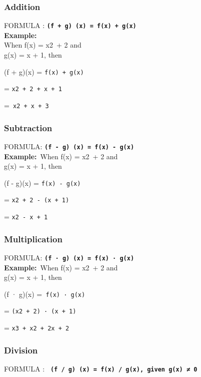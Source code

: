 \documentclass[
]{article}
\begin{document}
\hypertarget{addition}{%
\subsubsection{Addition}\label{addition}}

FORMULA : \textbf{\texttt{(f\ +\ g)\ (x)\ =\ f(x)\ +\ g(x)}}\\
\textbf{Example:}~\\
When f(x) = x2~+ 2 and\\
g(x) = x + 1, then

(f + g)(x) = \texttt{f(x)\ +\ g(x)}

= \texttt{x2~+\ 2\ +\ x\ +\ 1}

=\texttt{\ x2~+\ x\ +\ 3}

\hypertarget{subtraction}{%
\subsubsection{Subtraction}\label{subtraction}}

FORMULA: \textbf{\texttt{(f\ -\ g)\ (x)\ =\ f(x)\ -\ g(x)}}\\
\textbf{Example:}~When f(x) = x2~+ 2 and\\
g(x) = x + 1, then

(f - g)(x) = \texttt{f(x)\ -\ g(x)}

= \texttt{x2~+\ 2\ -\ (x\ +\ 1)}

= \texttt{x2~-\ x\ +\ 1}

\hypertarget{multiplication}{%
\subsubsection{Multiplication}\label{multiplication}}

FORMULA: \textbf{\texttt{(f\ ·\ g)\ (x)\ =\ f(x)\ ·\ g(x)}}\\
\textbf{Example:}~When f(x) = x2~+ 2 and\\
g(x) = x + 1, then

(f · g)(x) =\texttt{\ f(x)\ ·\ g(x)}

= \texttt{(x2~+\ 2)\ ·\ (x\ +\ 1)}

= \texttt{x3~+\ x2~+\ 2x\ +\ 2}

\hypertarget{division}{%
\subsubsection{Division}\label{division}}

FORMULA :
\textbf{\texttt{\ (f\ /\ g)\ (x)\ =\ f(x)\ /\ g(x),\ given\ g(x)\ ≠\ 0}}
\end{document}
